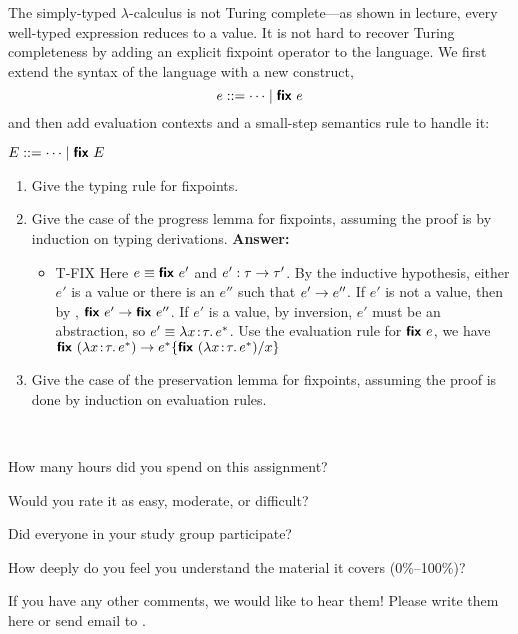 \documentclass[11pt]{article}
\begin{document}
\begin{exercise}
The simply-typed $\lambda$-calculus is not Turing complete---as shown
in lecture, every well-typed expression reduces to a value. It is not
hard to recover Turing completeness by adding an explicit fixpoint
operator to the language. We first extend the syntax of the language
with a new construct,
\[
e ::= \dots \mid \textsf{\textbf{fix}}~e\\
\]
and then add evaluation contexts and a small-step semantics rule to
handle it:
\begin{center}
$E ::= \dots \mid \textsf{\textbf{fix}}~E$

\end{center}

\begin{enumerate}
\item Give the typing rule for fixpoints.
\item Give the case of the progress lemma for fixpoints, assuming the proof is by induction on typing derivations.
\newline
\newline
\textbf{Answer:}
	\begin{itemize}
		\item T-FIX \newline
		Here $e \equiv \typ{fix}\ e'$ and $e':\tau \rightarrow \tau'$. By the inductive hypothesis, either $e'$ is a value
		or there is an $e''$ such that $e' \rightarrow e''$.
		\newline
		If $e'$ is not a value, then by , $\textsf{\textbf{fix}}\ e' \rightarrow \textsf{\textbf{fix}}\ e''$. If $e'$ is a
		value, by inversion, $e'$ must be an abstraction, so $e' \equiv \lambda x\!:\!\tau.\,e^{\ast}$. 
		Use the evaluation rule for $\textsf{\textbf{fix}}\ e$, we have $\textsf{\textbf{fix}}~(\lambda x\!:\!\tau.\,e^{\ast}) \rightarrow
		 e^{\ast}\{\textsf{\textbf{fix}}~(\lambda x\!:\!\tau.\,e^{\ast}) / x\}$
	\end{itemize}
\item Give the case of the preservation lemma for fixpoints, assuming the proof is done by induction on evaluation rules.
\end{enumerate}

\end{exercise}



\begin{debriefing} \hfill\\[-4ex]
\begin{enumerate*}
\item How many hours did you spend on this assignment? 
\item Would you rate it as easy, moderate, or difficult? 
\item Did everyone in your study group participate? 
\item How deeply do you feel you understand the material it covers (0\%--100\%)? 
\item If you have any other comments, we would like to hear them!
  Please write them here or send email to
  .
\end{enumerate*}
\end{debriefing}
\end{document}
